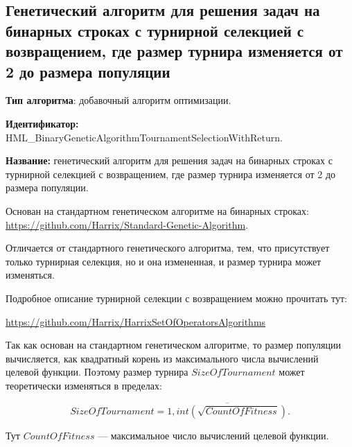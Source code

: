 \subsection{Генетический алгоритм для решения задач на бинарных строках с турнирной селекцией с возвращением, где размер турнира изменяется от 2 до размера популяции}\label{HarrixOptimizationAlgorithms:HML_BinaryGeneticAlgorithmTournamentSelectionWithReturn}

\textbf{Тип алгоритма}: добавочный алгоритм оптимизации.

\textbf{Идентификатор:} HML\_BinaryGeneticAlgorithmTournamentSelectionWithReturn.

\textbf{Название:} генетический алгоритм для решения задач на бинарных строках с турнирной селекцией с возвращением, где размер турнира изменяется от 2 до размера популяции.

Основан на стандартном генетическом алгоритме на бинарных строках:  \href{https://github.com/Harrix/Standard-Genetic-Algorithm}{https://github.com/Harrix/Standard-Genetic-Algorithm}. 

Отличается от стандартного генетического алгоритма, тем, что присутствует только турнирная селекция, но и она измененная, и размер турнира может изменяться.

Подробное описание турнирной селекции с возвращением можно прочитать тут:

\href{https://github.com/Harrix/HarrixSetOfOperatorsAlgorithms}{https://github.com/Harrix/HarrixSetOfOperatorsAlgorithms}


Так как основан на стандартном генетическом алгоритме, то размер популяции вычисляется, как квадратный корень из максимального числа вычислений целевой функции. Поэтому размер турнира $SizeOfTournament$ может теоретически  изменяться в пределах:

\begin{equation}
SizeOfTournament = \overline{1,int\left( \sqrt{CountOfFitness}\right) }.
\end{equation}

Тут $CountOfFitness$ --- максимальное число вычислений целевой функции.

